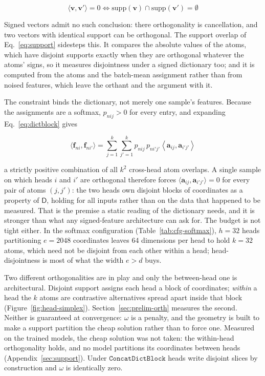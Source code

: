 \begin{equation}
	\langle \mathbf{v},\mathbf{v}'\rangle = 0
	\iff
	\mathrm{supp}(\mathbf{v}) \cap \mathrm{supp}(\mathbf{v}') = \emptyset
	\label{eq:disjoint}
\end{equation}

Signed vectors admit no such conclusion: there orthogonality is
cancellation, and two vectors with identical support can be orthogonal.
The support overlap of Eq.~\eqref{eq:support} sidesteps this. It
compares the absolute values of the atoms, which have disjoint supports
exactly when they are orthogonal whatever the atoms' signs, so it
measures disjointness under a signed dictionary too; and it is computed
from the atoms and the batch-mean assignment rather than from noised
features, which leave the orthant and the argument with it.

The constraint binds the dictionary, not merely one sample's features.
Because the assignments are a softmax, $p_{nij} > 0$ for every entry, and expanding
Eq.~\eqref{eq:dictblock} gives

\begin{equation}
	\langle \mathbf{f}_{ni},\mathbf{f}_{ni'}\rangle =
	\sum^{k}_{j=1}\sum^{k}_{j'=1} p_{nij}\,p_{ni'j'}
	\left\langle \mathbf{a}_{ij}, \mathbf{a}_{i'j'} \right\rangle
	\label{eq:cross_head}
\end{equation}

a strictly positive combination of all $k^2$ cross-head atom overlaps.
A single sample on which heads $i$ and $i'$ are orthogonal therefore
forces $\langle \mathbf{a}_{ij}, \mathbf{a}_{i'j'}\rangle = 0$ for every
pair of atoms $(j,j')$: the two heads own disjoint blocks of coordinates
as a property of $\mathsf{D}$, holding for all inputs rather than on the
data that happened to be measured. That is the premise a static reading
of the dictionary needs, and it is stronger than what any signed-feature
architecture can ask for. The budget is not tight either. In the softmax
configuration (Table~\ref{tab:cfg-softmax}), $h{=}32$ heads partitioning
$e{=}2048$ coordinates leaves
64 dimensions per head to hold $k{=}32$ atoms, which need not be
disjoint from each other within a head; head-disjointness is most of
what the width $e > d$ buys.

Two different orthogonalities are in play and only the between-head one
is architectural. Disjoint support assigns each head a block of
coordinates; \emph{within} a head the $k$ atoms are contrastive
alternatives spread apart inside that block
(Figure~\ref{fig:head-simplex}). Section~\ref{sec:prelim-orth} measures
the second. Neither is guaranteed at convergence: $\omega$ is a penalty,
and the geometry is built to make a support partition the cheap solution
rather than to force one. Measured on the trained models, the cheap
solution was not taken: the within-head orthogonality holds, and no model
partitions its coordinates between heads (Appendix~\ref{sec:support}).
Under $\mathtt{ConcatDictBlock}$ heads write disjoint slices by
construction and $\omega$ is identically zero.

